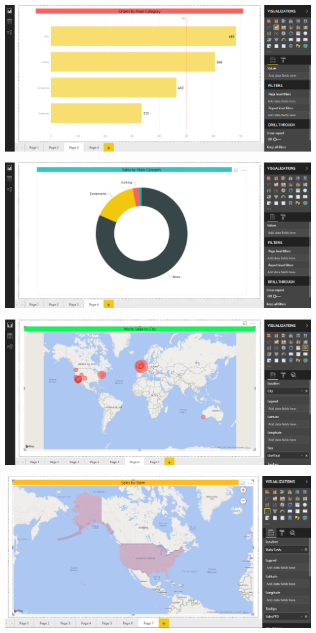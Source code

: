 	\begin{center}
	\includegraphics[width=15cm]{./Imagenes/power24}
	\end{center}	

	\begin{center}
	\includegraphics[width=15cm]{./Imagenes/power25}
	\end{center}	

	\begin{center}
	\includegraphics[width=15cm]{./Imagenes/power26}
	\end{center}	

	\begin{center}
	\includegraphics[width=15cm]{./Imagenes/power27}
	\end{center}	

